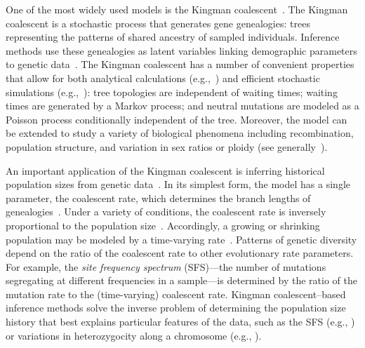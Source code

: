 \documentclass[11pt, letterpaper]{article}   	%
\begin{document}
One of the most widely used models is the Kingman coalescent~\autocite{Kingman1982a, Kingman1982b, Kingman1982c, Hudson1983, Tajima1983}.
The Kingman coalescent is a stochastic process that generates gene genealogies: trees representing the patterns of shared ancestry of sampled individuals.
Inference methods use these genealogies as latent variables linking demographic parameters to genetic data~\autocite{RosenbergNordborg2002}.
The Kingman coalescent has a number of convenient properties that allow for both analytical calculations (e.g.,~\cite{Tajima1989}) and efficient stochastic simulations (e.g.,~\cite{Hudson2002}): tree topologies are independent of waiting times; waiting times are generated by a Markov process; and neutral mutations are modeled as a Poisson process conditionally independent of the tree.
Moreover, the model can be extended to study a variety of biological phenomena including recombination, population structure, and variation in sex ratios or ploidy (see generally~\cite{Wakeley2009}).

An important application of the Kingman coalescent is inferring historical population sizes from genetic data~\autocite{SchraiberAkey2015}.
In its simplest form, the model has a single parameter, the coalescent rate, which determines the branch lengths of genealogies~\autocite{Kingman1982a}.
Under a variety of conditions, the coalescent rate is inversely proportional to the population size~\autocite{Kingman1982b}.
Accordingly, a growing or shrinking population may be modeled by a time-varying rate~\autocite{GriffithsTavare1994, GriffithsTavare1998}.
Patterns of genetic diversity depend on the ratio of the coalescent rate to other evolutionary rate parameters.
For example, the \emph{site frequency spectrum} (SFS)---the number of mutations segregating at different frequencies in a sample---is determined by the ratio of the mutation rate to the (time-varying) coalescent rate.
Kingman coalescent--based inference methods solve the inverse problem of determining the population size history that best explains particular features of the data, such as the SFS (e.g., \cite{BhaskarEtAl2015}) or variations in heterozygocity along a chromosome (e.g., \cite{LiDurbin2011}).
\end{document}
